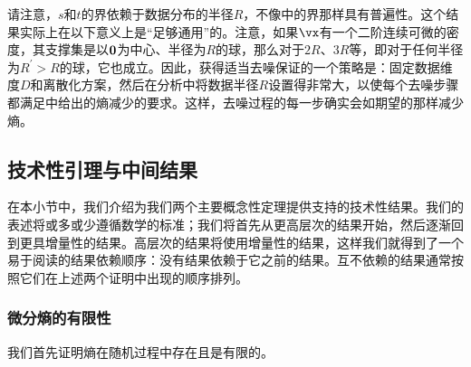 \documentclass[../../book-main.tex]{subfiles}
\begin{document}
请注意，\(s\)和\(t\)的界依赖于数据分布的半径\(R\)，不像中的界那样具有普遍性。这个结果实际上在以下意义上是“足够通用”的。注意，如果\(\vx\)有一个二阶连续可微的密度，其支撑集是以\(\bm{0}\)为中心、半径为\(R\)的球，那么对于\(2R\)、\(3R\)等，即对于任何半径为\(R^{\prime} > R\)的球，它也成立。因此，获得适当去噪保证的一个策略是：固定数据维度\(D\)和离散化方案，然后在分析中将数据半径\(R\)设置得非常大，以使每个去噪步骤都满足中给出的熵减少的要求。这样，去噪过程的每一步确实会如期望的那样减少熵。

 
\subsection{技术性引理与中间结果}\label{sub:app_diffusion_intermediate_results}

在本小节中，我们介绍为我们两个主要概念性定理提供支持的技术性结果。我们的表述将或多或少遵循数学的标准；我们将首先从更高层次的结果开始，然后逐渐回到更具增量性的结果。高层次的结果将使用增量性的结果，这样我们就得到了一个易于阅读的结果依赖顺序：没有结果依赖于它之前的结果。互不依赖的结果通常按照它们在上述两个证明中出现的顺序排列。


\subsubsection{微分熵的有限性}

我们首先证明熵在随机过程中存在且是有限的。
\end{document}
